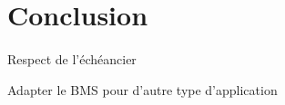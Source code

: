 \section{Conclusion}

	\paragraph{}
	Respect de l’échéancier
	
	Adapter le BMS pour d'autre type d'application